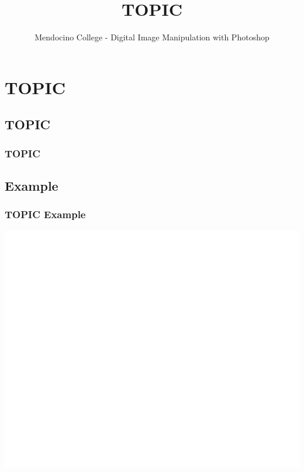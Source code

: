 \documentclass{beamer}
\title{TOPIC}
\author{Mendocino College - Digital Image Manipulation with Photoshop}
\date{\vspace{-5em}}
\begin{document}
	{
		\begin{frame}
			\vspace{-35pt}
			\maketitle
		\end{frame}
	}
		
		
\section{TOPIC}

\subsection{TOPIC}		

	\begin{frame}
		\frametitle{TOPIC}
		\begin{outline}
			\1 
		\end{outline}
	\end{frame}

\subsection{Example}		
	\begin{frame}
		\frametitle{TOPIC Example}
		\begin{center}
			\includegraphics[width=1.0\textwidth]{images/TOPIC example.png}
		\end{center}
	\end{frame}
\end{document}

